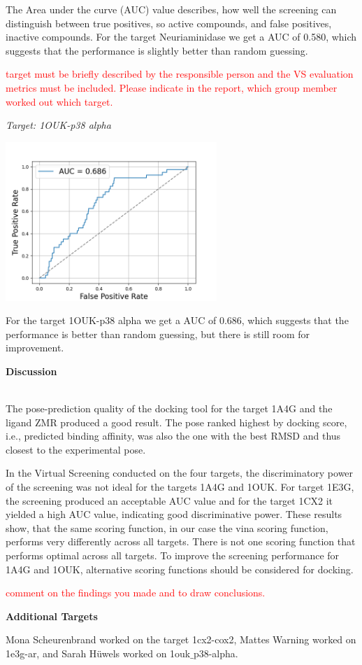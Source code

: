 \documentclass[a4paper,10pt]{article}
\begin{document}
The Area under the curve (AUC) value describes, how well the screening can distinguish between true positives, so active compounds, and false positives, inactive compounds. For the target Neuriaminidase we get a AUC of 0.580, which suggests that the performance is slightly better than random guessing. 

\textcolor{red}{target must be
briefly described by the responsible person and the VS evaluation metrics must be included. Please indicate in
the report, which group member worked out which target.}

\textit{Target: 1OUK-p38 alpha}

\begin{center}
\includegraphics[width=8cm]{figures/ROC-1OUK.png}
\end{center}

For the target 1OUK-p38 alpha we get a AUC of 0.686, which suggests that the performance is better than random guessing, but there is still room for improvement.

\begin{large}
	\vspace{0.5cm}
	\textbf{Discussion}
\end{large}	\\ [1mm]

The pose-prediction quality of the docking tool for the target 1A4G and the ligand ZMR produced a good result. The pose ranked highest by docking score, i.e., predicted binding affinity, was also  the one with the best RMSD and thus closest to the experimental pose. 

In the Virtual Screening conducted on the four targets, the discriminatory power of the screening was not ideal for the targets 1A4G and 1OUK. For target 1E3G, the screening produced an acceptable AUC value and for the target 1CX2 it yielded  a high AUC value, indicating good discriminative power. These results show, that the same scoring function, in our case the vina scoring function, performs very differently across all targets. There is not one scoring function that performs optimal across all targets. To improve the screening performance for 1A4G and 1OUK, alternative scoring functions should be considered for docking.

\textcolor{red}{comment on the findings you made and to draw conclusions.}



\textbf{Additional Targets}

Mona Scheurenbrand worked on the target 1cx2-cox2, Mattes Warning worked on 1e3g-ar, and Sarah Hüwels worked on 1ouk$\_$p38-alpha.



\end{document}
